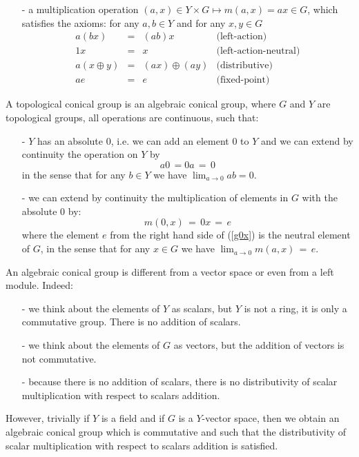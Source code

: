 \begin{enumerate}
\begin{equation}
\end{equation}
\item[-] a multiplication operation $\displaystyle (a,x) \in Y \times G \mapsto m(a,x) = ax \in G$, which satisfies the axioms: for any $a, b \in Y$ and for any $x, y \in G$ 
\begin{equation}
\begin{array}{rclr}
a\left(b x \right) & = & \left( a b \right) x & \mbox{(left-action)} \\ 
1 x  & = &  x & \mbox{(left-action-neutral)} \\ 
a\left(x \oplus y \right) & = &  \left(a x\right) \oplus \left(a y\right) & \mbox{(distributive)} \\ 
a e & = & e & \mbox{(fixed-point)}
\end{array}
\label{multax}
\end{equation}
\end{enumerate}

\begin{definition}
A topological conical group is an algebraic conical group, where $G$ and $Y$ are topological groups, all operations are continuous, such that: 
\begin{enumerate}
\item[-] $Y$ has an absolute $0$, i.e. we can add an element $0$ to $Y$ and we can extend by continuity the operation on $Y$ by 
\begin{equation}
a 0 \, = 0 a \, = \, 0
\label{yabsolute}
\end{equation}
in the sense that for any $b \in Y$ we have $\displaystyle \lim_{a \rightarrow 0} ab = 0$. 
\item[-] we can extend by continuity the multiplication of elements in $G$ with the absolute $0$ by: 
\begin{equation}
m(0,x) \, = \, 0 x \, = \, e
\label{g0x}
\end{equation}
where the element $e$ from the right hand side of (\ref{g0x}) is the neutral element of $G$, in the sense that 
 for any $x \in G$ we have $\displaystyle \lim_{a \rightarrow 0} m(a,x) \, = \, e$.
\end{enumerate}
\end{definition}

An algebraic conical group is different from a vector space or even from a left module. Indeed: 
\begin{enumerate}
\item[-] we think about the elements of $Y$ as scalars, but $Y$ is not a ring, it is only a commutative group. There is no addition of scalars.
\item[-] we think about the elements of $G$ as vectors, but the addition of vectors is not commutative. 
\item[-] because there is no addition of scalars, there is no distributivity of scalar multiplication with respect to scalars addition.
\end{enumerate}
However, trivially if $Y$ is a field and if $G$ is a $Y$-vector space, then we obtain an algebraic conical group which is commutative and such that the distributivity of scalar multiplication with respect to scalars addition is satisfied. 

